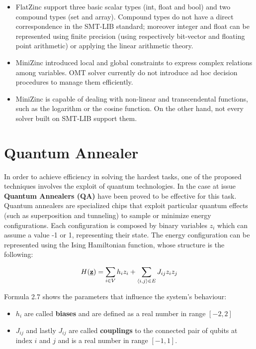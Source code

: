 \begin{itemize}
    \item FlatZinc support three basic scalar types (int, float and bool) and two compound types (set and array). Compound types do not have a direct correspondence in the SMT-LIB standard; moreover integer and float can be represented using finite precision (using respectively bit-vector and floating point arithmetic) or applying the linear arithmetic theory.
    \item MiniZinc introduced local and global constraints to express complex relations among variables. OMT solver currently do not introduce ad hoc decision procedures to manage them efficiently.
    \item MiniZinc is capable of dealing with non-linear and transcendental functions, such as the logarithm or the cosine function. On the other hand, not every solver built on SMT-LIB support them.
\end{itemize}

\section{Quantum Annealer}
\label{sec:quantum}

In order to achieve efficiency in solving the hardest tasks, one of the proposed techniques involves the exploit of quantum technologies. In the case at issue \textbf{Quantum Annealers (QA)} have been proved to be effective for this task. \\
Quantum annealers are specialized chips that exploit particular quantum effects (such as superposition and tunneling) to sample or minimize energy configurations. Each configuration is composed by binary variables $z_i$ which can assume a value -1 or 1, representing their state. The energy configuration can be represented using the Ising Hamiltonian function, whose structure is the following:

\begin{equation}
    H(\textbf{\underline{z}}) = \sum_{i \in V} h_iz_i + \sum_{\langle i,j\rangle \in E} J_{ij} z_iz_j
\end{equation}

Formula 2.7 shows the parameters that influence the system's behaviour: 

\begin{itemize}
    \item $h_i$ are called \textbf{biases} and are defined as a real number in range $[-2,2]$
    \item $J_{ij}$ and lastly $J_{ij}$ are called \textbf{couplings} to the connected pair of qubits at index $i$ and $j$ and is a real number in range $[-1,1]$.
\end{itemize}

